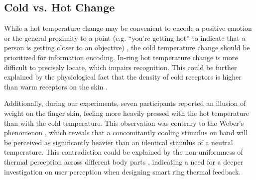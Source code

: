 \documentclass[preprint,12pt]{elsarticle}
\begin{document}
\subsection{Cold vs. Hot Change}
While a hot temperature change may be convenient to encode a positive emotion \cite{41} or the general proximity to a point (e.g. ``you're getting hot'' to indicate that a person is getting closer to an objective) \cite{34}, the cold temperature change should be prioritized for information encoding. In-ring hot temperature change is more difficult to precisely locate, which impairs recognition. This could be further explained by the physiological fact that the density of  cold receptors is higher than warm receptors on the skin \cite{15}.

Additionally, during our experiments, seven participants reported an illusion of weight on the finger skin, feeling more heavily pressed with the hot temperature than with the cold temperature. This observation was contrary to the Weber's phenomenon \cite{4}, which reveals that a concomitantly cooling stimulus on hand will be perceived as significantly heavier than an identical stimulus of a neutral temperature. This contradiction could be explained by the non-uniformness of thermal perception across different body parts \cite{31}, indicating a need for a deeper investigation on user perception when designing smart ring thermal feedback.
\end{document}
